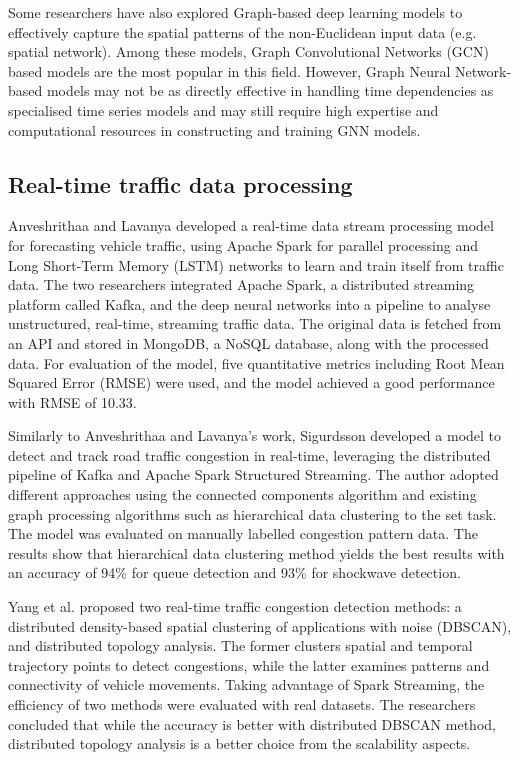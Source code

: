 \documentclass[11pt]{uonthesis}
\begin{document}
Some researchers have also explored Graph-based deep learning models to effectively capture the spatial patterns of the non-Euclidean input data (e.g. spatial network). Among these models, Graph Convolutional Networks (GCN) based models\cite{gcn1}\cite{gcn2}\cite{agafonov} are the most popular in this field. However, Graph Neural Network-based models may not be as directly effective in handling time dependencies as specialised time series models and may still require high expertise and computational resources in constructing and training GNN models\cite{li2024unifyinglaneleveltrafficprediction}.  

\subsection{Real-time traffic data processing}

Anveshrithaa and Lavanya\cite{9077707} developed a real-time data stream processing model for forecasting vehicle traffic, using Apache Spark for parallel processing and Long Short-Term Memory (LSTM) networks to learn and train itself from traffic data. The two researchers integrated Apache Spark, a distributed streaming platform called Kafka, and the deep neural networks into a pipeline to analyse unstructured, real-time, streaming traffic data. The original data is fetched from an API and stored in MongoDB, a NoSQL database, along with the processed data. For evaluation of the model, five quantitative metrics including Root Mean Squared Error (RMSE) were used, and the model achieved a good performance with RMSE of 10.33.

Similarly to Anveshrithaa and Lavanya's work, Sigurdsson\cite{Sigurdsson2018RoadTC} developed a model to detect and track road traffic congestion in real-time, leveraging the distributed pipeline of Kafka and Apache Spark Structured Streaming. The author adopted different approaches using the connected components algorithm and existing graph processing algorithms such as hierarchical data clustering to the set task. The model was evaluated on manually labelled congestion pattern data. The results show that hierarchical data clustering method yields the best results with an accuracy of 94\% for queue detection and 93\% for shockwave detection. %

Yang et al.\cite{Yang2019} proposed two real-time traffic congestion detection methods: a distributed density-based spatial clustering of applications with noise (DBSCAN), and distributed topology analysis. The former clusters spatial and temporal trajectory points to detect congestions, while the latter examines patterns and connectivity of vehicle movements. Taking advantage of Spark Streaming, the efficiency of two methods were evaluated with real datasets. The researchers concluded that while the accuracy is better with distributed DBSCAN method, distributed topology analysis is a better choice from the scalability aspects. 
\end{document}
